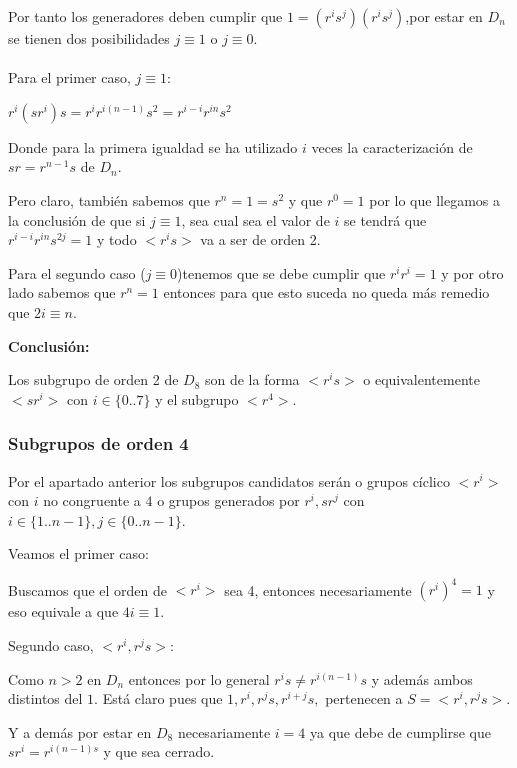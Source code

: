 \documentclass[12pt]{article}
\begin{document}
Por tanto los generadores deben cumplir que $1 = (r^is^j)(r^is^j)$,por estar en $D_n$ se tienen dos posibilidades 
$j \equiv 1$ o $j \equiv 0.$ 
\paragraph{}
Para el primer caso, $j \equiv 1$:


$r^i(sr^i)s= r^i r^{i(n-1)} s^{2} = r^{i-i} r^{in} s^{2}$

Donde para la primera igualdad se ha utilizado $i$ veces la caracterización de $sr = r^{n-1}s$ de $D_n$.

Pero claro, también sabemos que $r^n = 1 = s^2$ y que $r^0 = 1$ 
por lo que llegamos a la conclusión de que si $j \equiv 1$, sea cual sea el valor de $i$
se tendrá que 
$r^{i-i} r^{in} s^{2j} = 1$ y todo $<r^i s>$ va a ser de orden 2. 

Para el segundo caso ($j \equiv 0$)tenemos que se debe cumplir que $r^i r^i = 1$ y por otro lado sabemos que $r^n = 1$ entonces para que esto
suceda no queda más remedio que $ 2i \equiv n.$

\textbf{Conclusión:}

Los subgrupo de orden 2 de $D_8$ son de la forma $<r^i s>$ o equivalentemente $<s r^i>$ con
$i \in \{0..7\}$ y el subgrupo $<r^4>.$

\subsubsection*{Subgrupos de orden 4}
Por el apartado anterior los subgrupos candidatos serán o grupos cíclico $<r^i>$ con $i$ no congruente a $4$ 
o grupos generados por $r^i, sr^j$ con $i \in \{1..n-1\}, j \in \{0..n-1\}.$

Veamos el primer caso: 

Buscamos que el orden de $<r^i>$ sea 4, entonces necesariamente $(r^i)^4 = 1$ y eso equivale a que $4i \equiv 1.$

Segundo caso, $<r^i, r^js>:$


Como $n>2$ en $D_n$ entonces por lo general $r^i s \neq r^{i(n-1)} s$ y además ambos distintos del $1.$ 
Está claro pues que $1,r^i,r^js,r^{i+j} s,$ pertenecen a $S = <r^i,r^js>.$ 

Y a demás por estar en $D_8$ necesariamente $i=4$  ya que debe de cumplirse que $s r^i= r^{i(n-1) s}$
y que sea cerrado. 
\end{document}
